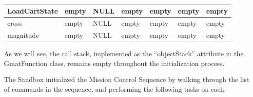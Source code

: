 \begin{center}
\tablehead{
}
\tabletail{
}
\tablelasttail{\hline}
\begin{supertabular}{|m{0.9in}|m{0.8in}|m{0.7in}|m{0.7in}|m{0.7in}|m{0.8in}|m{0.7in}|}
LoadCartState & empty & NULL & empty & empty & empty & empty\\ \hline
cross & empty & NULL & empty & empty & empty & empty\\ \hline
magnitude & empty & NULL & empty & empty & empty & empty\\ \hline
\end{supertabular}
\end{center}

\noindent As we will see, the call stack, implemented as the ``objectStack'' attribute in the
GmatFunction class, remains empty throughout the initialization process.

The Sandbox initialized the Mission Control Sequence by walking through the list of commands in the
sequence, and performing the following tasks on each:

